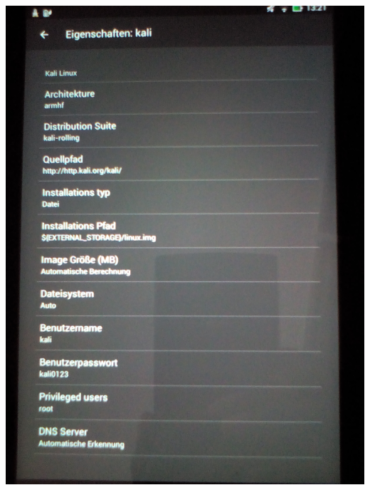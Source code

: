 \documentclass[11pt,a4paper]{article}
\begin{document}
\includegraphics[scale=0.09]{./Image/img3} \\ \\
\end{document}
